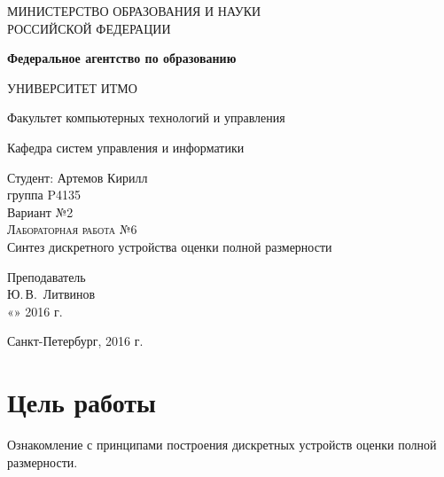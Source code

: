 \documentclass[a4paper,14pt]{extreport}
\begin{document}
	
	\begin{titlepage}
		\begin{center}
			\large
			МИНИСТЕРСТВО ОБРАЗОВАНИЯ И НАУКИ\\ РОССИЙСКОЙ ФЕДЕРАЦИИ
			
			\textbf{Федеральное агентство по образованию}
			\vspace{0.5cm}
			
			УНИВЕРСИТЕТ ИТМО
			\vspace{0.25cm}
			
			Факультет компьютерных технологий и управления
			
			Кафедра систем управления и информатики
			\vfill
			
			
			Студент: Артемов Кирилл\\
			группа P4135\\
			Вариант №2\\
			\textsc{Лабораторная работа №6}\\[5mm]
			
			{\LARGE Синтез дискретного устройства оценки полной размерности}
			\bigskip
			
		\end{center}
		\vfill
		
		\newlength{\ML}
		\hfill\begin{minipage}{0.4\textwidth}
			Преподаватель\\
			\underline{\hspace{\ML}} Ю.\,В.~Литвинов\\
			«\underline{\hspace{0.7cm}}» \underline{\hspace{2cm}} 2016 г.
		\end{minipage}%
		\bigskip
		
		\vfill
		
		\begin{center}
			Санкт-Петербург, 2016 г.
		\end{center}
	\end{titlepage}
	\newpage
	
	\section{Цель работы}
	
	Ознакомление с принципами построения дискретных устройств оценки полной	размерности.
	
\end{document}
